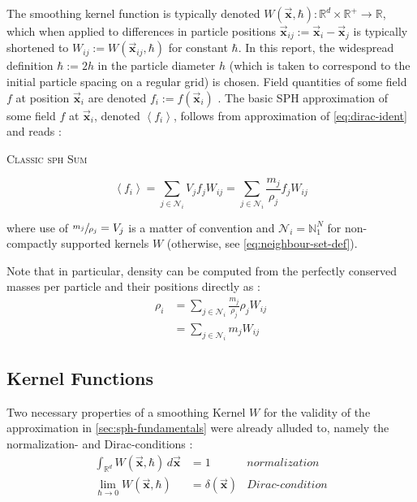 \documentclass[conference]{IEEEtran}
\newcommand\vek[1]{\vec{\bm{#1}}}
\newcommand\br[1]{\left(#1\right)}
\newcommand\abr[1]{\left\langle#1\right\rangle}
\newcommand{\equationnamed}[2]{%
  \setlength{\fboxsep}{2pt} %
  \setlength{\fboxrule}{0.01pt}
  \begin{center}
    \begin{minipage}{\linewidth}
      \begin{center}\textsc{#1}\end{center}
      #2
    \end{minipage}
  \end{center}
}
\begin{document}
The smoothing kernel function is typically denoted $W\br{\vek{x}, \hbar}: \mathds{R}^d\times\mathds{R}^+\to\mathds{R}$, which when applied to differences in particle positions $\vek{x}_{ij} := \vek{x}_i - \vek{x}_j$ is typically shortened to $W_{ij}:=W\br{\vek{x}_{ij}, \hbar}$ for constant $\hbar$. In this report, the widespread definition $\hbar:=2h$ in the particle diameter $h$ (which is taken to correspond to the initial particle spacing on a regular grid) is chosen. Field quantities of some field $f$ at position $\vek{x}_i$ are denoted $f_i := f(\vek{x}_i)$ \cite{tutorial2019}. The basic SPH approximation of some field $f$ at $\vek{x}_i$, denoted $\abr{f_i}$, follows from approximation of \autoref{eq:dirac-ident} and reads \cite{tutorial2019}:
\equationnamed{Classic \ac{sph} Sum}{
  \begin{equation}\label{eq:sph-sum-basic}
    \abr{f_i} = \sum_{j\in\mathcal{N}_i} V_j f_j W_{ij} = \sum_{j\in\mathcal{N}_i} \frac{m_j}{\rho_j} f_j W_{ij}
  \end{equation}
}
where use of $\sfrac{m_j}{\rho_j} = V_j$ is a matter of convention and $\mathcal{N}_i = \mathds{N}_1^N$ for non-compactly supported kernels $W$ (otherwise, see \autoref{eq:neighbour-set-def}).

Note that in particular, density can be computed from the perfectly conserved masses per particle and their positions directly as \cite{tutorial2019}:
\begin{equation}\label{eq:density-estimate}
\begin{aligned}
  \rho_i &= \sum_{j\in\mathcal{N}_i} \frac{m_j}{\rho_j} \rho_j W_{ij}\\
  &= \sum_{j\in\mathcal{N}_i} m_j  W_{ij}
\end{aligned}
\end{equation}

\subsection{Kernel Functions}
Two necessary properties of a smoothing Kernel $W$ for the validity of the approximation in \autoref{sec:sph-fundamentals} were already alluded to, namely the normalization- and Dirac-conditions \cite{tutorial2019}:
\begin{equation}
  \begin{aligned}
    \int_{\mathds{R}^d} W\br{\vek{x}, \hbar} \,d\vek{x} &= 1 & \textit{normalization}\\
    \lim_{\hbar\to 0} W\br{\vek{x}, \hbar} &= \delta\br{\vek{x}} & \textit{Dirac-condition}\\
  \end{aligned}
\end{equation}
\end{document}
